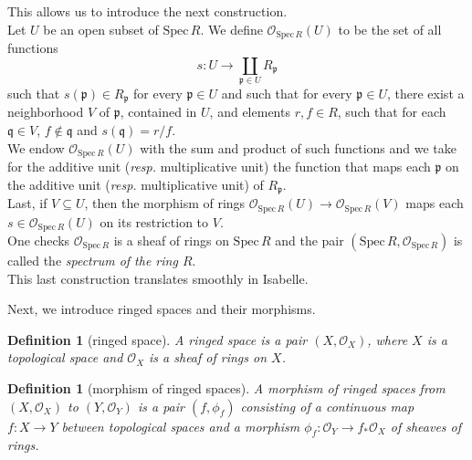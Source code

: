 \documentclass[12pt]{scrartcl}
\newtheorem{definition}[proposition]{Definition}
\def\spec{\text{Spec}\,R}
\begin{document}
This allows us to introduce the next construction.	\\
Let $U$ be an open subset of $\text{Spec}\,R$. We define $\mathscr{O}_{\spec}(U)$ to be the set of all functions 
	\[
	s: U \rightarrow \coprod \limits_{\mathfrak{p} \in U} R_{\mathfrak{p}}
	\]
such that $s(\mathfrak{p}) \in R_{\mathfrak{p}}$ for every $\mathfrak{p} \in U$ and such that for every $\mathfrak{p} \in U$, there exist a neighborhood $V$ of $\mathfrak{p}$, contained in $U$, and elements $r, f \in R$, such that for each $\mathfrak{q} \in V$, $f \notin \mathfrak{q}$ and $s(\mathfrak{q}) = r/f$. \\
We endow $\mathscr{O}_{\spec}(U)$ with the sum and product of such functions and we take for the additive unit (\textit{resp.} multiplicative unit) the function that maps each $\mathfrak{p}$ on the additive unit (\textit{resp.} multiplicative unit) of $R_{\mathfrak{p}}$. \\
Last, if $V \subseteq U$, then the morphism of rings $\mathscr{O}_{\spec}(U) \rightarrow \mathscr{O}_{\spec}(V)$ maps each $s \in \mathscr{O}_{\spec}(U)$ on its restriction to $V$. \\
One checks $\mathscr{O}_{\spec}$ is a sheaf of rings on $\text{Spec}\,R$ and the pair $(\text{Spec}\,R, \mathscr{O}_{\spec})$ is called the \emph{spectrum of the ring $R$}. \\
This last construction translates smoothly in Isabelle. 


Next, we introduce ringed spaces and their morphisms.

\begin{definition}[ringed space]
	A ringed space is a pair $(X, \mathscr{O}_X)$, where $X$ is a topological space and $\mathscr{O}_X$ is a sheaf of rings on $X$.
\end{definition}


\begin{definition}[morphism of ringed spaces]
	A morphism of ringed spaces from $(X, \mathscr{O}_X)$ to $(Y, \mathscr{O}_Y)$ is a pair $(f, \phi_f)$ consisting of a continuous map $f: X \rightarrow Y$ between topological spaces and a morphism $\phi_f: \mathscr{O}_Y \rightarrow f_{*} \mathscr{O}_X$ of sheaves of rings.   
\end{definition}

\end{document}
